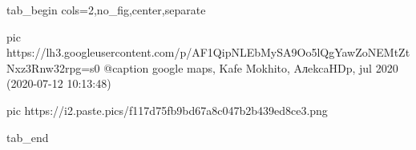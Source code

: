  
 
 
 
 

\ifcmt
  tab_begin cols=2,no_fig,center,separate

		 pic https://lh3.googleusercontent.com/p/AF1QipNLEbMySA9Oo5lQgYawZoNEMtZtNxz3Rnw32rpg=s0
		 @caption google maps, Kafe Mokhito, AлekcaHDp, jul 2020 (2020-07-12 10:13:48)

		 pic https://i2.paste.pics/f117d75fb9bd67a8c047b2b439ed8ce3.png

  tab_end
\fi

